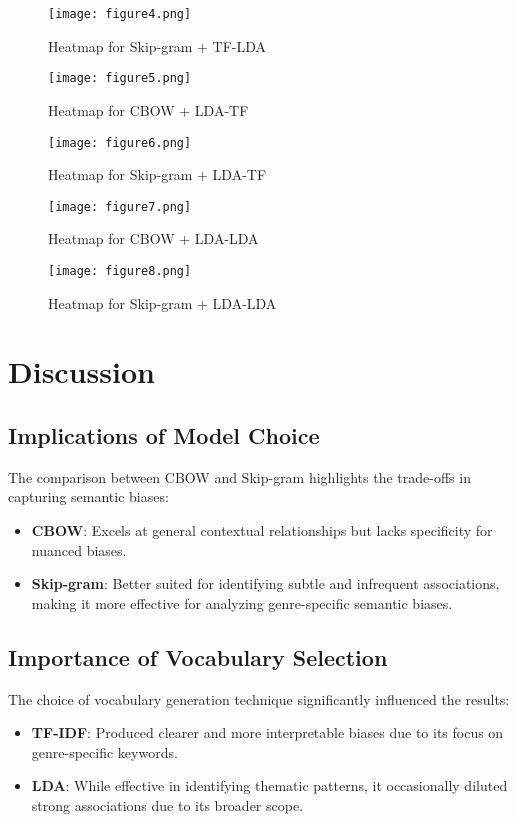 \documentclass[conference]{IEEEtran}
\begin{document}
\begin{figure}[htbp]
    \centering
    \texttt{[image: figure4.png]}
    \caption{Heatmap for Skip-gram + TF-LDA}
    \label{fig:skipgram-tf-lda}
\end{figure}

\begin{figure}[htbp]
    \centering
    \texttt{[image: figure5.png]}
    \caption{Heatmap for CBOW + LDA-TF}
    \label{fig:cbow-lda-tf}
\end{figure}

\begin{figure}[htbp]
    \centering
    \texttt{[image: figure6.png]}
    \caption{Heatmap for Skip-gram + LDA-TF}
    \label{fig:skipgram-lda-tf}
\end{figure}

\begin{figure}[htbp]
    \centering
    \texttt{[image: figure7.png]}
    \caption{Heatmap for CBOW + LDA-LDA}
    \label{fig:cbow-lda-lda}
\end{figure}

\begin{figure}[htbp]
    \centering
    \texttt{[image: figure8.png]}
    \caption{Heatmap for Skip-gram + LDA-LDA}
    \label{fig:skipgram-lda-lda}
\end{figure}
\clearpage

\section{Discussion}

\subsection{Implications of Model Choice}
The comparison between CBOW and Skip-gram highlights the trade-offs in capturing semantic biases:
\begin{itemize}
    \item \textbf{CBOW}: Excels at general contextual relationships but lacks specificity for nuanced biases.
    \item \textbf{Skip-gram}: Better suited for identifying subtle and infrequent associations, making it more effective for analyzing genre-specific semantic biases.
\end{itemize}

\subsection{Importance of Vocabulary Selection}
The choice of vocabulary generation technique significantly influenced the results:
\begin{itemize}
    \item \textbf{TF-IDF}: Produced clearer and more interpretable biases due to its focus on genre-specific keywords.
    \item \textbf{LDA}: While effective in identifying thematic patterns, it occasionally diluted strong associations due to its broader scope.
\end{itemize}
\end{document}
